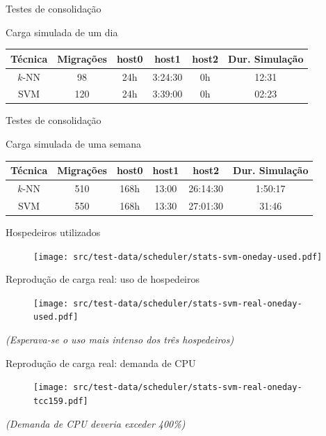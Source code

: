 \documentclass{beamer}
\begin{document}
\begin{frame}{Testes de consolidação}
\begin{block}{Carga simulada de um dia}
\begin{table}
\centering
\begin{tabular}{| c | c | c | c | c | c |}
\hline
Técnica & Migrações & host0  & host1   & host2 & Dur. Simulação \\
\hline
$k$-NN 	& 98        & 24h    & 3:24:30 & 0h    & 12:31  \\
\hline
SVM 	& 120       & 24h    & 3:39:00 & 0h    & 02:23  \\
\hline
\end{tabular}
\end{table}
\end{block}
\end{frame}

\begin{frame}{Testes de consolidação}
\begin{block}{Carga simulada de uma semana}
\begin{table}
\begin{tabular}{| c | c | c | c | c | c |}
\hline
Técnica & Migrações & host0  & host1    & host2       & Dur. Simulação \\
\hline
$k$-NN 	& 510        & 168h  & 13:00    & 26:14:30    & 1:50:17  \\
\hline
SVM 	& 550        & 168h  & 13:30 	& 27:01:30    & 31:46  \\
\hline
\end{tabular}
\end{table}
\end{block}
\end{frame}

\begin{frame}{Hospedeiros utilizados}
\begin{figure}
\centering
\texttt{[image: src/test-data/scheduler/stats-svm-oneday-used.pdf]}
\end{figure}
\end{frame}

\begin{frame}{Reprodução de carga real: uso de hospedeiros}
\begin{figure}
\centering
\texttt{[image: src/test-data/scheduler/stats-svm-real-oneday-used.pdf]}
\end{figure}
\tiny{\emph{(Esperava-se o uso mais intenso dos três hospedeiros)}}
\end{frame}

\begin{frame}{Reprodução de carga real: demanda de CPU}
\begin{figure}
\centering
\texttt{[image: src/test-data/scheduler/stats-svm-real-oneday-tcc159.pdf]}
\end{figure}
\tiny{\emph{(Demanda de CPU deveria exceder 400\%)}}
\end{frame}
\end{document}
